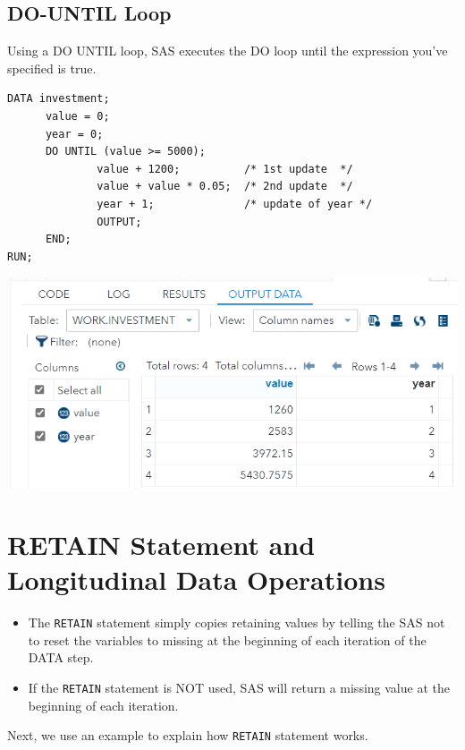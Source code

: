 \documentclass[
]{book}
\begin{document}
\hypertarget{do-until-loop}{%
\subsection{DO-UNTIL Loop}\label{do-until-loop}}

Using a DO UNTIL loop, SAS executes the DO loop until the expression you've specified is true.

\begin{verbatim}
DATA investment; 
      value = 0;
      year = 0;
      DO UNTIL (value >= 5000); 
              value + 1200;          /* 1st update  */
              value + value * 0.05;  /* 2nd update  */
              year + 1;              /* update of year */
              OUTPUT; 
      END; 
RUN;
\end{verbatim}

\begin{center}\includegraphics[width=1\linewidth]{img10/w10-DO-UNTIL} \end{center}

\hypertarget{retain-statement-and-longitudinal-data-operations}{%
\section{RETAIN Statement and Longitudinal Data Operations}\label{retain-statement-and-longitudinal-data-operations}}

\begin{itemize}
\item
  The \texttt{RETAIN} statement simply copies retaining values by telling the SAS not to reset the variables to missing at the beginning of each iteration of the DATA step.
\item
  If the \texttt{RETAIN} statement is NOT used, SAS will return a missing value at the beginning of each iteration.
\end{itemize}

Next, we use an example to explain how \texttt{RETAIN} statement works.
\end{document}
